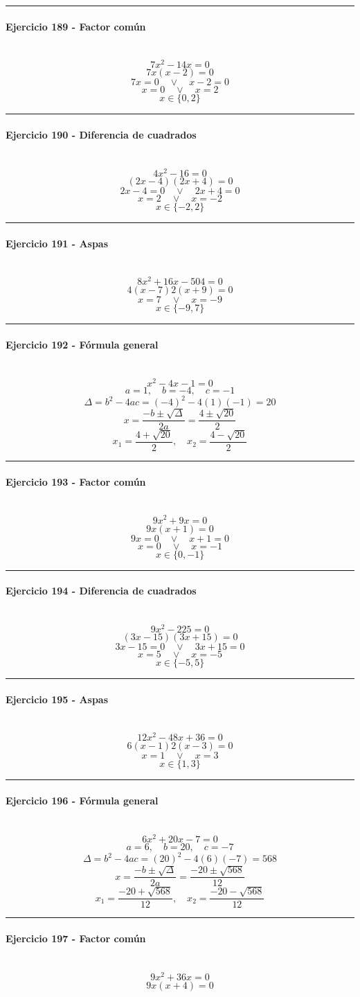\documentclass[10pt,a4paper]{article}
\newcommand{\res}[1]{\paragraph{#1}\mbox{}\\[-1.2em]}
\begin{document}
\vspace{1mm}\hrule\vspace{2mm}
\res{Ejercicio 189 - Factor común}
\[ 7 x^{2} - 14 x=0 \]
\[ 7x(x-2)=0 \]
\[ 7x=0 \quad \vee \quad x-2=0 \]
\[ x=0 \quad \vee \quad x=2 \]
\[ \boxed{x\in\{0,2\}} \]
\vspace{1mm}\hrule\vspace{2mm}
\res{Ejercicio 190 - Diferencia de cuadrados}
\[ 4 x^{2} - 16=0 \]
\[ (2x-4)(2x+4)=0 \]
\[ 2x-4=0 \quad \vee \quad 2x+4=0 \]
\[ x=2 \quad \vee \quad x=-2 \]
\[ \boxed{x\in\{-2,2\}} \]
\vspace{1mm}\hrule\vspace{2mm}
\res{Ejercicio 191 - Aspas}
\[ 8 x^{2} + 16 x - 504=0 \]
\[ 4(x-7)2(x+9)=0 \]
\[ x=7 \quad \vee \quad x=-9 \]
\[ \boxed{x\in\{-9,7\}} \]
\vspace{1mm}\hrule\vspace{2mm}
\res{Ejercicio 192 - Fórmula general}
\[ x^{2} - 4 x - 1=0 \]
\[ a=1,\quad b=-4,\quad c=-1 \]
\[ \Delta=b^2-4ac=(-4)^2-4(1)(-1)=20 \]
\[ x=\frac{-b\pm\sqrt{\Delta}}{2a}=\frac{4\pm\sqrt{20}}{2} \]
\[ \boxed{x_1=\frac{4+\sqrt{20}}{2},\quad x_2=\frac{4-\sqrt{20}}{2}} \]
\vspace{1mm}\hrule\vspace{2mm}
\res{Ejercicio 193 - Factor común}
\[ 9 x^{2} + 9 x=0 \]
\[ 9x(x+1)=0 \]
\[ 9x=0 \quad \vee \quad x+1=0 \]
\[ x=0 \quad \vee \quad x=-1 \]
\[ \boxed{x\in\{0,-1\}} \]
\vspace{1mm}\hrule\vspace{2mm}
\res{Ejercicio 194 - Diferencia de cuadrados}
\[ 9 x^{2} - 225=0 \]
\[ (3x-15)(3x+15)=0 \]
\[ 3x-15=0 \quad \vee \quad 3x+15=0 \]
\[ x=5 \quad \vee \quad x=-5 \]
\[ \boxed{x\in\{-5,5\}} \]
\vspace{1mm}\hrule\vspace{2mm}
\res{Ejercicio 195 - Aspas}
\[ 12 x^{2} - 48 x + 36=0 \]
\[ 6(x-1)2(x-3)=0 \]
\[ x=1 \quad \vee \quad x=3 \]
\[ \boxed{x\in\{1,3\}} \]
\vspace{1mm}\hrule\vspace{2mm}
\res{Ejercicio 196 - Fórmula general}
\[ 6 x^{2} + 20 x - 7=0 \]
\[ a=6,\quad b=20,\quad c=-7 \]
\[ \Delta=b^2-4ac=(20)^2-4(6)(-7)=568 \]
\[ x=\frac{-b\pm\sqrt{\Delta}}{2a}=\frac{-20\pm\sqrt{568}}{12} \]
\[ \boxed{x_1=\frac{-20+\sqrt{568}}{12},\quad x_2=\frac{-20-\sqrt{568}}{12}} \]
\vspace{1mm}\hrule\vspace{2mm}
\res{Ejercicio 197 - Factor común}
\[ 9 x^{2} + 36 x=0 \]
\[ 9x(x+4)=0 \]
\end{document}
